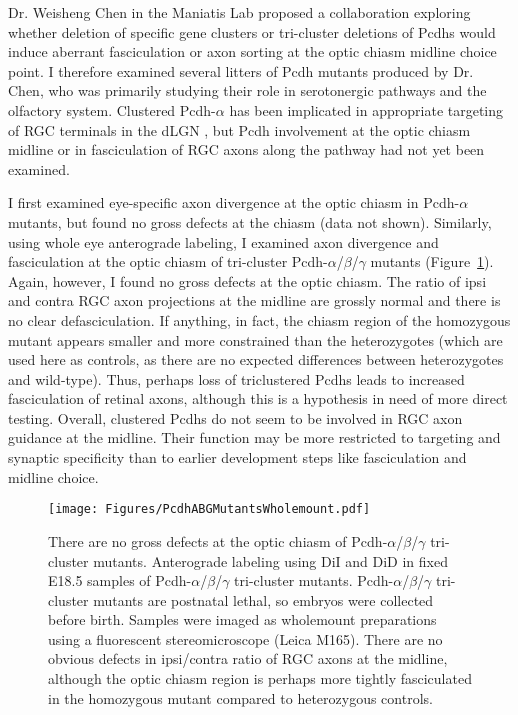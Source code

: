 Dr. Weisheng Chen in the Maniatis Lab proposed a collaboration exploring whether deletion of specific gene clusters or tri-cluster deletions of Pcdhs would induce aberrant fasciculation or axon sorting at the optic chiasm midline choice point.
I therefore examined several litters of Pcdh mutants produced by Dr. Chen, who was primarily studying their role in serotonergic pathways and the olfactory system.
Clustered Pcdh-$\alpha$ has been implicated in appropriate targeting of RGC terminals in the dLGN \cite{meguro2015impaired}, but Pcdh involvement at the optic chiasm midline or in fasciculation of RGC axons along the pathway had not yet been examined.

I first examined eye-specific axon divergence at the optic chiasm in Pcdh-$\alpha$ mutants, but found no gross defects at the chiasm (data not shown).
Similarly, using whole eye anterograde labeling, I examined axon divergence and fasciculation at the optic chiasm of tri-cluster Pcdh-$\alpha$/$\beta$/$\gamma$ mutants (Figure~\ref{PcdhABGMutantsWholemount}).
Again, however, I found no gross defects at the optic chiasm.
The ratio of ipsi and contra RGC axon projections at the midline are grossly normal and there is no clear defasciculation.
If anything, in fact, the chiasm region of the homozygous mutant appears smaller and more constrained than the heterozygotes (which are used here as controls, as there are no expected differences between heterozygotes and wild-type).
Thus, perhaps loss of triclustered Pcdhs leads to increased fasciculation of retinal axons, although this is a hypothesis in need of more direct testing.
Overall, clustered Pcdhs do not seem to be involved in RGC axon guidance at the midline.
Their function may be more restricted to targeting and synaptic specificity than to earlier development steps like fasciculation and midline choice.
\begin{figure}[hbtp]
    \begin{center}
        \texttt{[image: Figures/PcdhABGMutantsWholemount.pdf]}
        \caption[There are no gross defects at the optic chiasm of Pcdh-$\alpha$/$\beta$/$\gamma$ tri-cluster mutants.]
        {There are no gross defects at the optic chiasm of Pcdh-$\alpha$/$\beta$/$\gamma$ tri-cluster mutants.
        Anterograde labeling using DiI and DiD in fixed E18.5 samples of Pcdh-$\alpha$/$\beta$/$\gamma$ tri-cluster mutants.
        Pcdh-$\alpha$/$\beta$/$\gamma$ tri-cluster mutants are postnatal lethal, so embryos were collected before birth.
        Samples were imaged as wholemount preparations using a fluorescent stereomicroscope (Leica M165).
        There are no obvious defects in ipsi/contra ratio of RGC axons at the midline, although the optic chiasm region is perhaps more tightly fasciculated in the homozygous mutant compared to heterozygous controls.
        }
        \label{PcdhABGMutantsWholemount}
    \end{center}
\end{figure}
